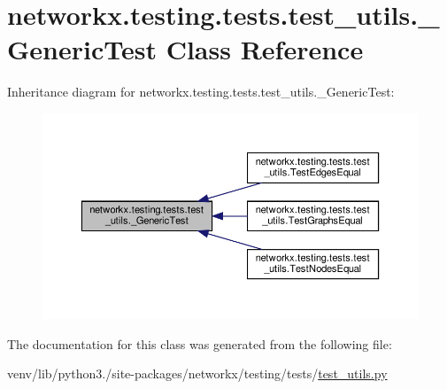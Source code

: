 \hypertarget{classnetworkx_1_1testing_1_1tests_1_1test__utils_1_1__GenericTest}{}\section{networkx.\+testing.\+tests.\+test\+\_\+utils.\+\_\+\+Generic\+Test Class Reference}
\label{classnetworkx_1_1testing_1_1tests_1_1test__utils_1_1__GenericTest}


Inheritance diagram for networkx.\+testing.\+tests.\+test\+\_\+utils.\+\_\+\+Generic\+Test\+:
\nopagebreak
\begin{figure}[H]
\begin{center}
\leavevmode
\includegraphics[width=350pt]{classnetworkx_1_1testing_1_1tests_1_1test__utils_1_1__GenericTest__inherit__graph}
\end{center}
\end{figure}


The documentation for this class was generated from the following file\+:\begin{DoxyCompactItemize}
\item 
venv/lib/python3./site-\/packages/networkx/testing/tests/\hyperlink{networkx_2testing_2tests_2test__utils_8py}{test\+\_\+utils.\+py}\end{DoxyCompactItemize}
